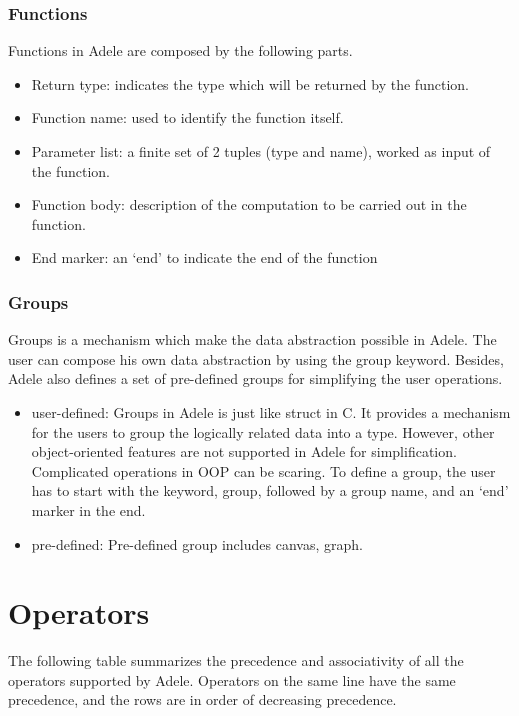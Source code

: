 \documentclass[11pt,letterpaper]{article}
\begin{document}
\subsubsection*{Functions} 
Functions in Adele are composed by the following parts.
	\begin{itemize}
		\item Return type: indicates the type which will be returned by the function.
		\item Function name: used to identify the function itself.
		\item Parameter list: a finite set of 2 tuples (type and name), worked as input of the function.
		\item Function body: description of the computation to be carried out in the function.
		\item End marker: an ‘end’ to indicate the end of the function
	\end{itemize}
	
\subsubsection*{Groups}

Groups is a mechanism which make the data abstraction possible in Adele. The user can compose his own data abstraction by using the group keyword. Besides, Adele also defines a set of pre-defined groups for simplifying the user operations.
	\begin{itemize}
		\item user-defined: Groups in Adele is just like struct in C. It provides a mechanism for the users to group the logically related 	data into a type. However, other object-oriented features are not supported in Adele for simplification. Complicated operations in OOP can be scaring. To define a group, the user has to start with the keyword, group, followed by a group name, and an ‘end’ marker in the end.
		\item pre-defined: Pre-defined group includes canvas, graph.
	\end{itemize}


\section {Operators}
The following table summarizes the precedence and associativity of all the operators supported by Adele. Operators on the same line have the same precedence, and the rows are in order of decreasing precedence.
\end{document}
